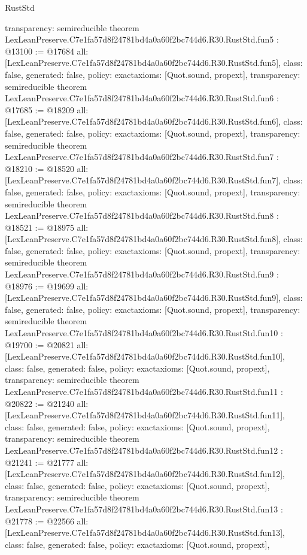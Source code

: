 \begin{lexlean}{RustStd}
\begin{coremodule}
{  transparency: semireducible
}
theorem LexLeanPreserve.C7e1fa57d8f24781bd4a0a60f2bc744d6.R30.RustStd.fun5 : @13100 := @17684 {
  all: [LexLeanPreserve.C7e1fa57d8f24781bd4a0a60f2bc744d6.R30.RustStd.fun5],
  class: false,
  generated: false,
  policy: exact{axioms: [Quot.sound, propext]},
  transparency: semireducible
}
theorem LexLeanPreserve.C7e1fa57d8f24781bd4a0a60f2bc744d6.R30.RustStd.fun6 : @17685 := @18209 {
  all: [LexLeanPreserve.C7e1fa57d8f24781bd4a0a60f2bc744d6.R30.RustStd.fun6],
  class: false,
  generated: false,
  policy: exact{axioms: [Quot.sound, propext]},
  transparency: semireducible
}
theorem LexLeanPreserve.C7e1fa57d8f24781bd4a0a60f2bc744d6.R30.RustStd.fun7 : @18210 := @18520 {
  all: [LexLeanPreserve.C7e1fa57d8f24781bd4a0a60f2bc744d6.R30.RustStd.fun7],
  class: false,
  generated: false,
  policy: exact{axioms: [Quot.sound, propext]},
  transparency: semireducible
}
theorem LexLeanPreserve.C7e1fa57d8f24781bd4a0a60f2bc744d6.R30.RustStd.fun8 : @18521 := @18975 {
  all: [LexLeanPreserve.C7e1fa57d8f24781bd4a0a60f2bc744d6.R30.RustStd.fun8],
  class: false,
  generated: false,
  policy: exact{axioms: [Quot.sound, propext]},
  transparency: semireducible
}
theorem LexLeanPreserve.C7e1fa57d8f24781bd4a0a60f2bc744d6.R30.RustStd.fun9 : @18976 := @19699 {
  all: [LexLeanPreserve.C7e1fa57d8f24781bd4a0a60f2bc744d6.R30.RustStd.fun9],
  class: false,
  generated: false,
  policy: exact{axioms: [Quot.sound, propext]},
  transparency: semireducible
}
theorem LexLeanPreserve.C7e1fa57d8f24781bd4a0a60f2bc744d6.R30.RustStd.fun10 : @19700 := @20821 {
  all: [LexLeanPreserve.C7e1fa57d8f24781bd4a0a60f2bc744d6.R30.RustStd.fun10],
  class: false,
  generated: false,
  policy: exact{axioms: [Quot.sound, propext]},
  transparency: semireducible
}
theorem LexLeanPreserve.C7e1fa57d8f24781bd4a0a60f2bc744d6.R30.RustStd.fun11 : @20822 := @21240 {
  all: [LexLeanPreserve.C7e1fa57d8f24781bd4a0a60f2bc744d6.R30.RustStd.fun11],
  class: false,
  generated: false,
  policy: exact{axioms: [Quot.sound, propext]},
  transparency: semireducible
}
theorem LexLeanPreserve.C7e1fa57d8f24781bd4a0a60f2bc744d6.R30.RustStd.fun12 : @21241 := @21777 {
  all: [LexLeanPreserve.C7e1fa57d8f24781bd4a0a60f2bc744d6.R30.RustStd.fun12],
  class: false,
  generated: false,
  policy: exact{axioms: [Quot.sound, propext]},
  transparency: semireducible
}
theorem LexLeanPreserve.C7e1fa57d8f24781bd4a0a60f2bc744d6.R30.RustStd.fun13 : @21778 := @22566 {
  all: [LexLeanPreserve.C7e1fa57d8f24781bd4a0a60f2bc744d6.R30.RustStd.fun13],
  class: false,
  generated: false,
  policy: exact{axioms: [Quot.sound, propext]},
}
\end{coremodule}
\end{lexlean}
